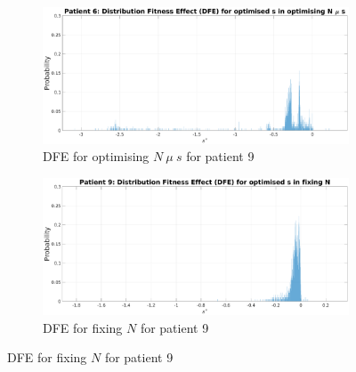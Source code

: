 \documentclass[12pt]{article}
\begin{document}
\begin{figure}[H]
    \centering
    
    \begin{subfigure}{1\textwidth}
        \includegraphics[width=\linewidth]{figures/patient/pt6/pt6_DFE_s.eps}
        \caption{DFE for optimising $N\ \mu\ s$ for patient 9}
        \label{fig:subfig1}
    \end{subfigure}
    
    \begin{subfigure}{1\textwidth}
        \includegraphics[width=\linewidth]{figures/patient/pt9/pt9_fixN_DFE_s.eps}
        \caption{DFE for fixing $N$ for patient 9}
        \label{fig:subfig2}
    \end{subfigure}
    
     \end{figure}
\end{document}
